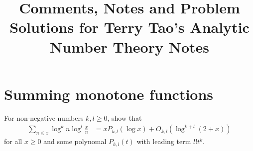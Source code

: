 \documentclass[11pt]{article}
\newenvironment{ex}[1]
  {\renewcommand\theinnercustomthm{#1}\innercustomthm}
  {\endinnercustomthm}
\begin{document}
\title{Comments, Notes and Problem Solutions for Terry Tao's Analytic Number Theory Notes}
\date{}
\maketitle

\section{Summing monotone functions}

\begin{ex}{4}\label{four}
For non-negative numbers $k,l\geq0$, show that
\begin{align}
\sum_{n\leq x}\log^k{n}\log^l{\frac{x}{n}} &= xP_{k,l}(\log{x})+O_{k,l}(\log^{k+l}{(2+x)})\label{four_result}
\end{align}
for all $x\geq 0$ and some polynomal $P_{k,l}(t)$ with leading term $l!t^k$.
\end{ex}
\end{document}
